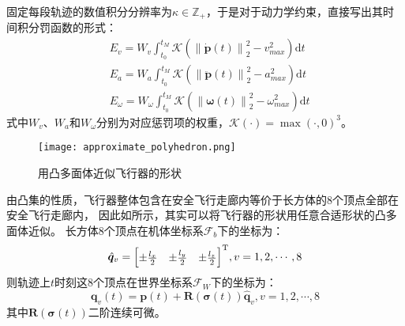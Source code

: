 固定每段轨迹的数值积分分辨率为$\kappa \in \mathbb{Z}_+$，于是对于动力学约束，直接写出其时间积分罚函数的形式：
\begin{align}
  &E_v = W_v \int_{t_0}^{t_M} \mathcal{K}(\left\|\dot{\bm{p}}(t)\right\|_2^2 - v_{max}^2)\mathrm{d}t 
  \label{equ:velocity_penalty} \\
  &E_a = W_a \int_{t_0}^{t_M} \mathcal{K}(\left\|\ddot{\bm{p}}(t)\right\|_2^2 - a_{max}^2)\mathrm{d}t 
  \label{equ:acceleration_penalty} \\
  &E_{\omega} = W_{\omega} \int_{t_0}^{t_M} \mathcal{K}(\left\|\bm{\omega}(t)\right\|_2^2 - {\omega}_{max}^2)\mathrm{d}t 
  \label{equ:angular_velocity_penalty}
\end{align}
式中$W_v$、$W_a$和$W_{\omega}$分别为对应惩罚项的权重，$\mathcal{K}(\cdot)=\max(\cdot, 0)^3$。

\begin{figure}[ht]
  \centering
  \texttt{[image: approximate\_polyhedron.png]}
  \caption{用凸多面体近似飞行器的形状}
  \label{fig:using_polyhedron_to_approximate_geometry_of_drone}
\end{figure}

由凸集的性质，飞行器整体包含在安全飞行走廊内等价于长方体的8个顶点全部在安全飞行走廊内，
因此如所示，其实可以将飞行器的形状用任意合适形状的凸多面体近似\cite{2021Fast}。
长方体8个顶点在机体坐标系$\mathscr{F}_b$下的坐标为：
\begin{equation}
  \hat{\bm{q}}_v = {
    \begin{bmatrix}
      \pm\frac{l_x}{2} & \pm\frac{l_y}{2} & \pm\frac{l_z}{2} 
    \end{bmatrix}
  }^{\text{T}}, v = 1, 2, \cdots, 8
  \label{equ:vertices_of_cuboid_in_body_frame}
\end{equation}
则轨迹上$t$时刻这8个顶点在世界坐标系$\mathscr{F}_W$下的坐标为：
\begin{equation}
  \bm{q}_v(t) = \bm{p}(t) + \bm{R}(\bm{\sigma}(t))\hat{\bm{q}}_v ,
  v = 1, 2, \cdots, 8
  \label{equ:vertices_of_cuboid_in_world_frame}
\end{equation}
其中$\bm{R}(\bm{\sigma}(t))$二阶连续可微。

